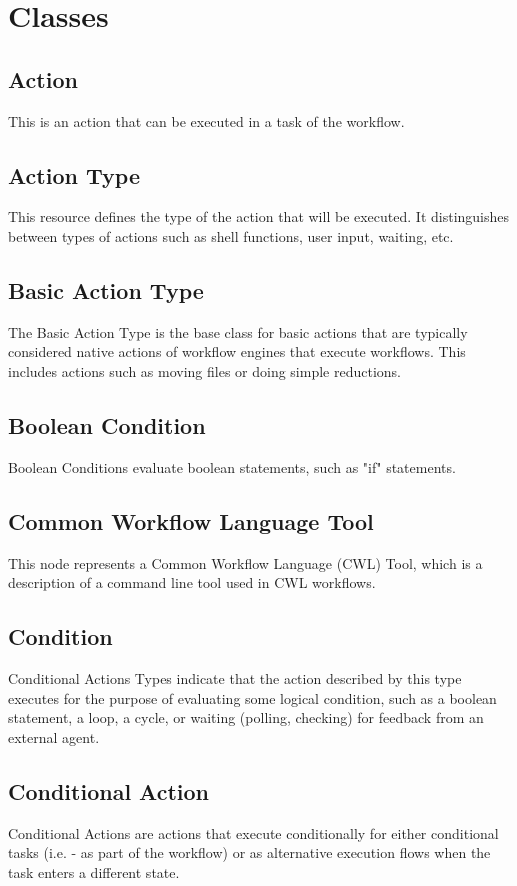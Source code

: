 \section{Classes}
			
			\subsection{
			Action
			}
			This is an action that can be executed in a task of the workflow.
			\subsection{
			Action Type
			}
			This resource defines the type of the action that will be executed. It distinguishes between types of actions such as shell functions, user input, waiting, etc.
			\subsection{
			Basic Action Type
			}
			The Basic Action Type is the base class for basic actions that are typically considered native actions of workflow engines that execute workflows. This includes actions such as moving files or doing simple reductions.
			\subsection{
			Boolean Condition
			}
			Boolean Conditions evaluate boolean statements, such as "if" statements.
			\subsection{
			Common Workflow Language Tool
			}
			This node represents a Common Workflow Language (CWL) Tool, which is a description of a command line tool used in CWL workflows.
			\subsection{
			Condition
			}
			Conditional Actions Types indicate that the action described by this type executes for the purpose of evaluating some logical condition, such as a boolean statement, a loop, a cycle, or waiting (polling, checking) for feedback from an external agent.
			\subsection{
			Conditional Action
			}
			Conditional Actions are actions that execute conditionally for either conditional tasks (i.e. - as part of the workflow) or as alternative execution flows when the task enters a different state.

